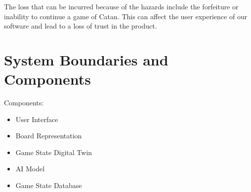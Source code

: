 \documentclass{article}
\begin{document}
The loss that can be incurred because of the hazards include the
forfeiture or inability to continue a game of Catan. This can affect the
user experience of our software and lead to a loss of trust in the product.


\section{System Boundaries and Components}\label{sec:system-boundaries-and-components}



Components: 
\begin{itemize}

\item User Interface
\item Board Representation
\item Game State Digital Twin
\item AI Model
\item Game State Database

\end{itemize}
\end{document}
